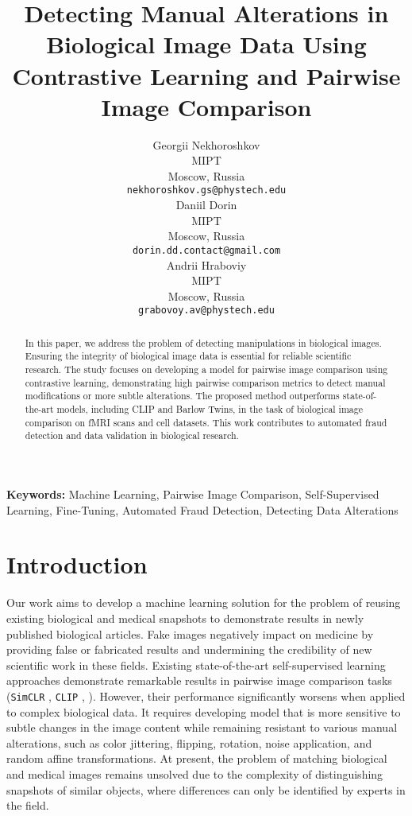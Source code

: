\documentclass{article}
\title{Detecting Manual Alterations in Biological Image Data 
Using Contrastive Learning and Pairwise Image Comparison}
\author{%
  Georgii Nekhoroshkov\\
  MIPT\\
  Moscow, Russia\\
  \texttt{nekhoroshkov.gs@phystech.edu}\\
  \And
  Daniil Dorin\\
  MIPT\\
  Moscow, Russia\\
  \texttt{dorin.dd.contact@gmail.com}\\
  \And
  Andrii Hraboviy\\
  MIPT\\
  Moscow, Russia\\
  \texttt{grabovoy.av@phystech.edu}\\
}
\begin{document}
\maketitle

\begin{abstract}

    In this paper, we address the problem of detecting manipulations in biological images. 
    Ensuring the integrity of biological 
    image data is essential for reliable scientific research. 
    The study focuses on developing a model for pairwise image comparison
    using contrastive learning, demonstrating high pairwise comparison metrics to detect 
    manual modifications or more subtle alterations. 
    The proposed method outperforms state-of-the-art models, 
    including CLIP and Barlow Twins, in the task of biological 
    image comparison on fMRI scans and cell datasets. 
    This work contributes to automated fraud detection and data validation in 
    biological research.

\end{abstract}

\textbf{Keywords:}
Machine Learning, Pairwise Image Comparison, Self-Supervised Learning, 
Fine-Tuning, Automated Fraud Detection, Detecting Data Alterations

\section{Introduction}\label{sec:intro}

Our work aims to develop a machine learning solution for the problem 
of reusing existing biological and medical snapshots to demonstrate results 
in newly published biological articles. Fake images negatively impact on 
medicine by providing false or fabricated results and undermining the credibility 
of new scientific work in these fields. Existing state-of-the-art self-supervised learning 
approaches demonstrate remarkable results in pairwise image comparison tasks 
(\texttt{SimCLR} \cite{chen2020simclr}, \texttt{CLIP} \cite{radford2021clip}, 
 \cite{zbontar2021barlow}). 
However, their performance significantly worsens when applied to complex biological data. 
It requires developing model that is more sensitive to subtle changes in the image content 
while remaining resistant to various manual alterations, such as color jittering, 
flipping, rotation, noise application, and random affine transformations. 
At present, the problem of matching biological and medical images remains unsolved due 
to the complexity of distinguishing snapshots of similar objects, where 
differences can only be identified by experts in the field.
\end{document}
